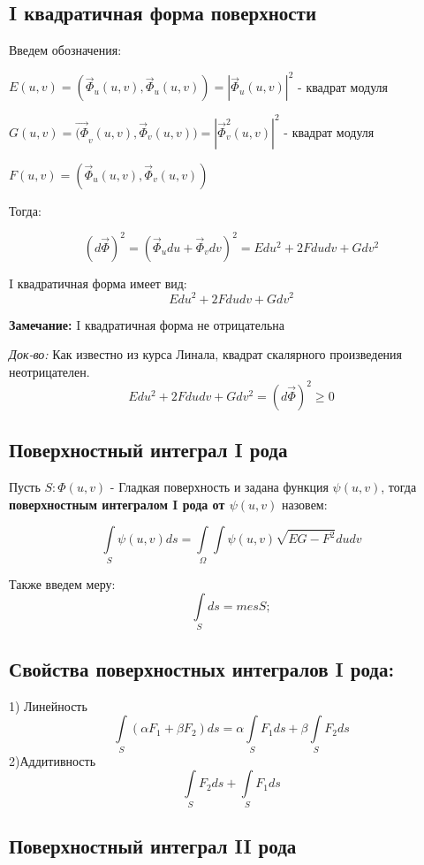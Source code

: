 \documentclass[12pt, english]{article}
\begin{document}
\subsection{I квадратичная форма поверхности}
	
	Введем обозначения:
		
	$E(u , v) = (\vec{\Phi}_u(u , v) , \vec{\Phi}_u( u, v)) = |\vec{\Phi}_u( u, v)|^2$ - квадрат модуля
	
	$G(u , v) = \vec{(\Phi}_v(u , v) , \vec{\Phi}_v( u, v)) = |\vec{\Phi}_v^2( u, v)|^2$ - квадрат модуля
	
	$F(u , v) = (\vec{\Phi}_u(u , v) , \vec{\Phi}_v( u, v))$ 
	
	Тогда:
	
	$$(d\vec{\Phi})^2 = (\vec{\Phi}_u du + \vec{\Phi}_v dv)^2 = Edu^2 + 2Fdudv + Gdv^2$$
	
	I квадратичная форма имеет вид:
	$$Edu^2 + 2Fdudv + Gdv^2$$			
	
\textbf{Замечание:}
	I квадратичная форма не отрицательна
	
\textit{Док-во:}
Как известно из курса Линала, квадрат скалярного произведения неотрицателен.
	$$Edu^2 + 2Fdudv + Gdv^2 = (d\vec{\Phi})^2 \geqslant 0$$
	
\subsection{Поверхностный интеграл I рода}
	Пусть $S : \Phi(u , v)$ - Гладкая поверхность и задана функция $\psi(u , v)$, тогда \textbf{поверхностным интегралом I рода от $\psi(u,v)$} назовем:
	
$$
\int\limits_{S} \psi(u , v) ds 
=
\int\limits_{\Omega}\int \psi(u,v)\sqrt{EG - F^2}dudv	
$$		
	
	Также введем меру:
$$
	\int\limits_{S}ds = mesS;
$$	
	
\subsection{Свойства поверхностных интегралов I рода:}
	1) Линейность
$$
\int\limits_{S} (\alpha F_1 + \beta F_2)ds
=
\alpha\int\limits_{S}  F_1ds
+
\beta\int\limits_{S}  F_2ds
$$
	2)Аддитивность	
$$
\int\limits_{S}  F_2ds
+
\int\limits_{S}  F_1ds
$$



\subsection{Поверхностный интеграл II рода}
\end{document}
